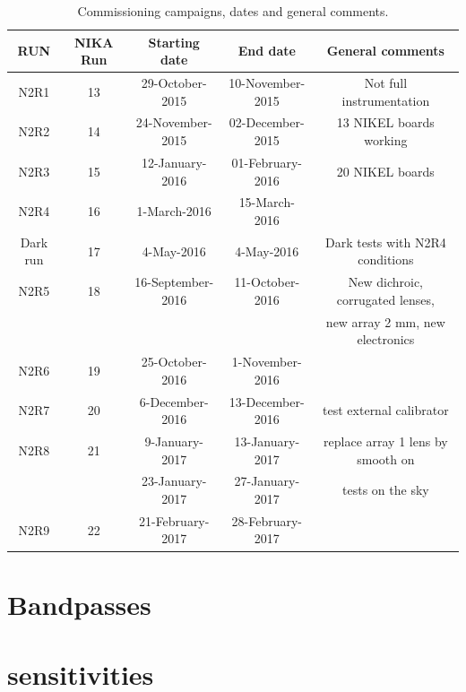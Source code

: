 \documentclass[a4paper, 11pt]{article} %
\begin{document}
\begin{table}[h]
\small
\caption{Commissioning campaigns, dates and general comments.
\label{nika2runs}}
\begin{tabular}{|c|c|c|c|c|}
\hline 
RUN  & NIKA Run & Starting date    & End date         &  General comments \\
\hline
N2R1     & 13       & 29-October-2015   & 10-November-2015 & Not full instrumentation        \\
N2R2     & 14       & 24-November-2015  & 02-December-2015 & 13 NIKEL boards working         \\
N2R3     & 15       & 12-January-2016   & 01-February-2016 & 20 NIKEL boards                 \\
N2R4     & 16       & 1-March-2016      & 15-March-2016    & 	                               \\
Dark run & 17       & 4-May-2016        & 4-May-2016       & Dark tests with N2R4 conditions  \\
\hline
N2R5     & 18       & 16-September-2016 & 11-October-2016  & New dichroic, corrugated lenses, \\
         &          &                   &                  &  new array 2 mm, new electronics \\
N2R6     & 19       & 25-October-2016   & 1-November-2016  &                                  \\
N2R7     & 20       & 6-December-2016   & 13-December-2016 & test external calibrator         \\
N2R8     & 21       & 9-January-2017    & 13-January-2017  & replace array 1 lens by smooth on \\
         &          & 23-January-2017   & 27-January-2017  & tests on the sky   \\
N2R9     & 22       & 21-February-2017  & 28-February-2017 &                                   \\  
\hline
\end{tabular} 
\end{table} 

\section{Bandpasses}


\section{sensitivities}
\end{document}
